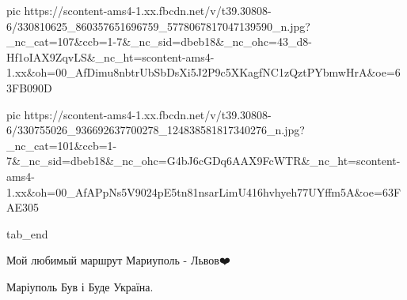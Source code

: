      pic https://scontent-ams4-1.xx.fbcdn.net/v/t39.30808-6/330810625_860357651696759_5778067817047139590_n.jpg?_nc_cat=107&ccb=1-7&_nc_sid=dbeb18&_nc_ohc=43_d8-Hf1oIAX9ZqvLS&_nc_ht=scontent-ams4-1.xx&oh=00_AfDimu8nbtrUbSbDsXi5J2P9c5XKagfNC1zQztPYbmwHrA&oe=63FB090D

     pic https://scontent-ams4-1.xx.fbcdn.net/v/t39.30808-6/330755026_936692637700278_124838581817340276_n.jpg?_nc_cat=101&ccb=1-7&_nc_sid=dbeb18&_nc_ohc=G4bJ6cGDq6AAX9FcWTR&_nc_ht=scontent-ams4-1.xx&oh=00_AfAPpNs5V9024pE5tn81nsarLimU416hvhyeh77UYffm5A&oe=63FAE305

  tab_end
\fi


Мой любимый маршрут Мариуполь - Львов❤️


Маріуполь Був і Буде Україна.
